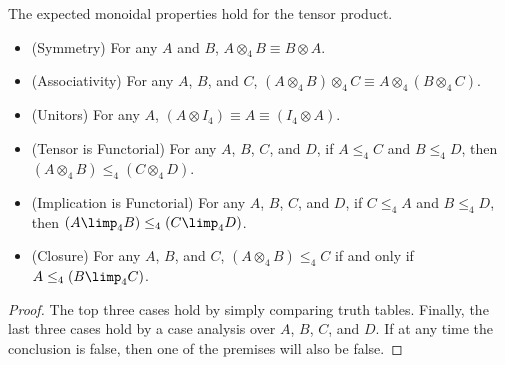 The expected monoidal properties hold for the tensor product.
\begin{lemma}
  \label{lemma:tensor_is_symmetric_monoidal_closed}
  \begin{itemize}
  \item[] (Symmetry) For any $A$ and $B$, $A \otimes_4 B \equiv B \otimes A$.\\[-5px]
  \item[] (Associativity) For any $A$, $B$, and $C$, $(A \otimes_4 B) \otimes_4 C \equiv A \otimes_4 (B \otimes_4 C)$.\\[-5px]
  \item[] (Unitors) For any $A$, $(A \otimes I_4) \equiv A \equiv (I_4 \otimes A)$.\\[-5px]
  \item[] (Tensor is Functorial) For any $A$, $B$, $C$, and $D$, if $A \leq_4 C$ and $B \le_4 D$, then
    $(A \otimes_4 B) \leq_4 (C \otimes_4 D)$.\\[-5px]
  \item[] (Implication is Functorial) For any $A$, $B$, $C$, and $D$, if
    $C \leq_4 A$ and $B \leq_4 D$, then $(A \limp_4 B) \leq_4 (C
    \limp_4 D)$.\\[-5px]
  \item[] (Closure) For any $A$, $B$, and $C$, $(A \otimes_4 B) \leq_4 C$ if and only if $A \leq_4 (B \limp_4 C)$.
  \end{itemize}
\end{lemma}
\begin{proof}
  The top three cases hold by simply comparing truth tables. Finally,
  the last three cases hold by a case analysis over $A$, $B$, $C$, and
  $D$.  If at any time the conclusion is false, then one of the
  premises will also be false.
\end{proof}

